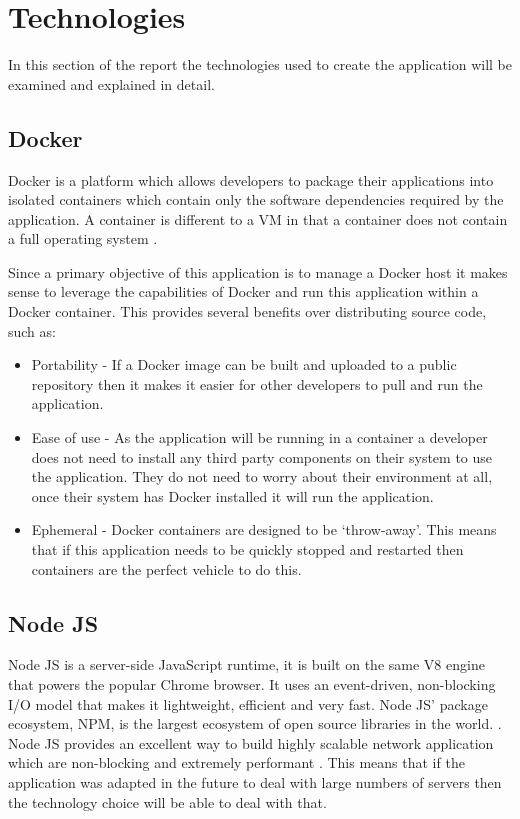 \section{Technologies}
\label{sec:technologies}
In this section of the report the technologies used to create the application will be examined and explained in detail.
\subsection{Docker}
\gls{Docker} is a platform which allows developers to package their applications into isolated containers which contain only the software dependencies required by the application. A container is different to a \gls{VM} in that a container does not contain a full operating system \citep{WhatDocker}.

Since a primary objective of this application is to manage a \gls{Docker host} it makes sense to leverage the capabilities of Docker and run this application within a \gls{Docker container}. This provides several benefits over distributing source code, such as:

\begin{itemize}
	\item Portability - If a \gls{Docker image} can be built and uploaded to a public repository then it makes it easier for other developers to pull and run the application.
	\item Ease of use - As the application will be running in a container a developer does not need to install any third party components on their system to use the application. They do not need to worry about their environment at all, once their system has Docker installed it will run the application.
	\item Ephemeral - Docker containers are designed to be `throw-away'. This means that if this application needs to be quickly stopped and restarted then containers are the perfect vehicle to do this.
\end{itemize}

\subsection{Node JS}
\label{sub:nodejs}
Node JS is a server-side JavaScript runtime, it is built on the same V8 engine that powers the popular Chrome browser. It uses an event-driven, non-blocking I/O model that makes it lightweight, efficient and very fast. Node JS' package ecosystem, NPM, is the largest ecosystem of open source libraries in the world. \citep{Nodejs.org2016}. Node JS provides an excellent way to build highly scalable network application which are non-blocking and extremely performant \citep{Griffin2011}. This means that if the application was adapted in the future to deal with large numbers of servers then the technology choice will be able to deal with that.


